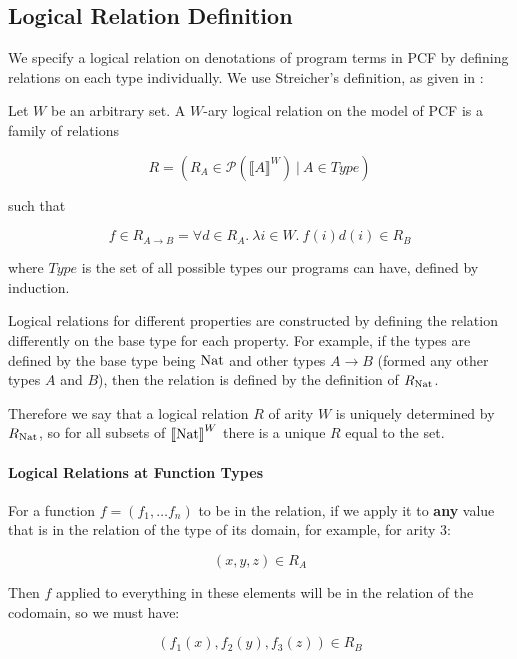 \subsection{Logical Relation Definition}
We specify a logical relation on denotations of program terms in PCF  by defining relations on each type individually. We use Streicher's definition, as given in \citep{Streicher06}: 

\vspace{0.5cm}

\begin{defn}
Let $W$ be an arbitrary set.  A $W$-ary logical relation on the model of PCF is a family of relations

\[R = (R_A \in \mathcal{P}(\llbracket A \rrbracket^W) \ | \ A \in Type)\]

such that

\[f \in R_{A \to B} = \forall d \in R_A. \ \lambda i \in W. \ f(i)d(i) \in R_B\]
\end{defn}

where $Type$ is the set of all possible types our programs can have, defined by induction.

Logical relations for different properties are constructed by defining the relation differently on the base type for each property. For example, if the types are defined by the base type being $\operatorname{Nat}$ and other types $A \to B$ (formed any other types $A$ and $B$), then the relation is defined by the definition of $R_{\operatorname{Nat}}$.

Therefore we say that a logical relation $R$ of arity $W$ is uniquely determined by $R_{\operatorname{Nat}}$, so for all subsets of ${\llbracket \operatorname{Nat} \rrbracket}^W$ there is a unique $R$ equal to the set. 

\vspace{0.5cm}

\paragraph{Logical Relations at Function Types}

For a function $f = (f_1, \dots f_n)$ to be in the relation, if we apply it to \textbf{any} value that is in the relation of the type of its domain, for example, for arity $3$:

\[ (x,y,z) \in R_A \]

Then $f$ applied to everything in these elements will be in the relation of the codomain, so we must have:

\[ (f_1(x),f_2(y),f_3(z)) \in R_B \]

